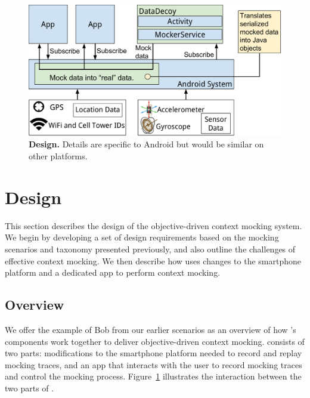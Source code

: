 \begin{figure}[t]
\centering
\includegraphics[width=\columnwidth]{./figures/architecture.pdf}

\caption{\textbf{\PocketMocker{} Design.} Details are specific to Android but
would be similar on other platforms.}

\label{fig-design}
\vspace*{-0.2in}
\end{figure}

\section{\PocketMocker{} Design}
\label{sec-design}

This section describes the design of the \PocketMocker{} objective-driven
context mocking system. We begin by developing a set of design requirements
based on the mocking scenarios and taxonomy presented previously, and also
outline the challenges of effective context mocking. We then describe how
\PocketMocker{} uses changes to the smartphone platform and a dedicated app
to perform context mocking.

\subsection{Overview}

We offer the example of Bob from our earlier scenarios as an overview
of how \PocketMocker{}'s components work together to deliver objective-driven
context mocking. \PocketMocker{} consists of two parts:  modifications to the
smartphone platform needed to record and replay mocking traces, and an app
that interacts with the user to record mocking traces and control the mocking
process. Figure~\ref{fig-design} illustrates the interaction between the two
parts of \PocketMocker{}.

